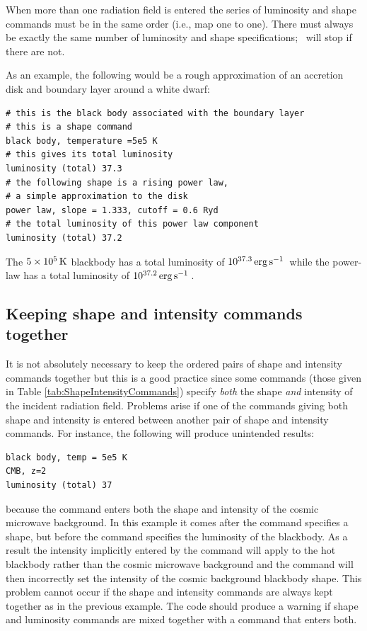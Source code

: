 When more than one radiation field is entered the series of luminosity and
shape commands must be in the same order (i.e., map one to one).  There
must always be exactly the same number of luminosity and shape
specifications; \Cloudy\ will stop if there are not.

As an example, the following would be a rough approximation of an
accretion disk and boundary layer around a white dwarf:
\begin{verbatim}
# this is the black body associated with the boundary layer
# this is a shape command
black body, temperature =5e5 K
# this gives its total luminosity 
luminosity (total) 37.3
# the following shape is a rising power law, 
# a simple approximation to the disk 
power law, slope = 1.333, cutoff = 0.6 Ryd
# the total luminosity of this power law component
luminosity (total) 37.2
\end{verbatim}
The $5\times 10^5 {\rm\thinspace K}$ blackbody has a total luminosity of
$10^{37.3} \mbox{${\rm\thinspace erg}{\rm\thinspace s}^{-1}\,$}$ while
the power-law has a total luminosity of
$10^{37.2} \mbox{${\rm\thinspace erg}{\rm\thinspace s}^{-1}\,$} $.

\subsection{Keeping shape and intensity commands together}

\noindent It is not absolutely necessary to keep
the ordered pairs of shape and
intensity commands together but this is a good practice
since some commands
(those given in Table \ref{tab:ShapeIntensityCommands})
specify \emph{both} the shape \emph{and} intensity of the incident
radiation field.
Problems arise if one of the commands giving both shape and intensity is
entered between another pair of shape and intensity commands.
For instance, the following will produce unintended results:
\begin{verbatim}
black body, temp = 5e5 K
CMB, z=2
luminosity (total) 37
\end{verbatim}
because the  command enters both the
shape and intensity of the cosmic microwave background.
In this example it comes after the  command
specifies a shape, but before the  command
specifies the luminosity of the blackbody.
As a result the intensity implicitly entered by the
command will apply to the hot blackbody rather than the cosmic
microwave background and the  command will
then incorrectly set
the intensity of the cosmic background blackbody shape.
This problem cannot
occur if the shape and intensity commands are always kept together as in
the previous example.  The code should produce a warning if shape and
luminosity commands are mixed together with a command that enters both.

